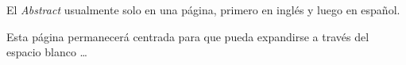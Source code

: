 \cleardoublepage %
{} 

\newenvironment{abstract}{ %
	\clearpage
	\thispagestyle{empty}
	\null\vfill
	\begin{center}%
		\Large\textit{\abstractname}
		\bigskip
	\end{center}
}%
{\vfill\null}

\begin{abstract}
	El \textit{Abstract} usualmente solo en una página, primero en inglés y luego en español.
	
	Esta página permanecerá centrada para que pueda expandirse a través del espacio blanco \ldots				
\end{abstract}


